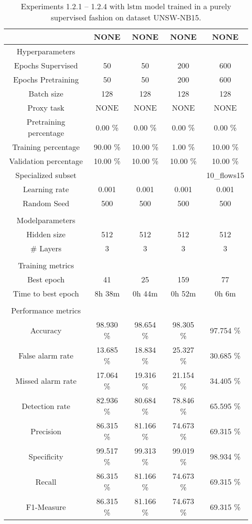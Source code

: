 \begin{table}[htb]
    \centering
    \caption{Experiments 1.2.1 – 1.2.4 with \gls{lstm} model trained in a purely supervised fashion on dataset UNSW-NB15.}
    \label{table:results:lstm:flows15_supervised}
    \begin{tabular}{@{}ccccc@{}}
        \toprule
         &  NONE &  NONE &  NONE &  NONE \\
        \midrule
        Hyperparameters &  &  &  &  \\
        Epochs Supervised &  50 &  50 &  200 &  600 \\
        Epochs Pretraining &  50 &  50 &  200 &  600 \\
        Batch size &  128 &  128 &  128 &  128 \\
        Proxy task &  NONE &  NONE &  NONE &  NONE \\
        Pretraining percentage &  0.00 \% &  0.00 \% &  0.00 \% &  0.00 \% \\
        Training percentage &  90.00 \% &  10.00 \% &  1.00 \% &  10.00 \% \\
        Validation percentage &  10.00 \% &  10.00 \% &  10.00 \% &  10.00 \% \\
        Specialized subset &   &   &   &  10\_flows15 \\
        Learning rate &  0.001 &  0.001 &  0.001 &  0.001 \\
        Random Seed &  500 &  500 &  500 &  500 \\
         \\
        Modelparameters &  &  &  &  \\
        Hidden size &  512 &  512 &  512 &  512 \\
        \# Layers &  3 &  3 &  3 &  3 \\
         \\
        Training metrics &  &  &  &  \\
        Best epoch &  41 &  25 &  159 &  77 \\
        Time to best epoch &  8h 38m &  0h 44m &  0h 52m &  0h 6m \\
         \\
        Performance metrics &  &  &  &  \\
        Accuracy &  98.930 \% &  98.654 \% &  98.305 \% &  97.754 \% \\
        False alarm rate &  13.685 \% &  18.834 \% &  25.327 \% &  30.685 \% \\
        Missed alarm rate &  17.064 \% &  19.316 \% &  21.154 \% &  34.405 \% \\
        Detection rate &  82.936 \% &  80.684 \% &  78.846 \% &  65.595 \% \\
        Precision &  86.315 \% &  81.166 \% &  74.673 \% &  69.315 \% \\
        Specificity &  99.517 \% &  99.313 \% &  99.019 \% &  98.934 \% \\
        Recall &  86.315 \% &  81.166 \% &  74.673 \% &  69.315 \% \\
        F1-Measure &  86.315 \% &  81.166 \% &  74.673 \% &  69.315 \% \\
        \bottomrule
    \end{tabular}
\end{table}